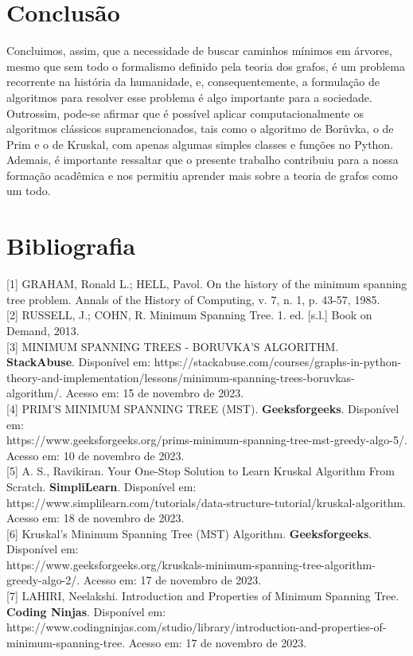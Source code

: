 \documentclass{article}
\begin{document}
\section{Conclusão}
Concluimos, assim, que a necessidade de buscar caminhos mínimos em árvores, mesmo que sem todo o formalismo definido pela teoria dos grafos, é um problema recorrente na história da humanidade, e, consequentemente, a formulação de algoritmos para resolver esse problema é algo importante para a sociedade. \\

Outrossim, pode-se afirmar que é possível aplicar computacionalmente os algoritmos clássicos supramencionados, tais como o algoritmo de Borůvka, o de Prim e o de Kruskal, com apenas algumas simples classes e funções no Python. \\

Ademais, é importante ressaltar que o presente trabalho contribuiu para a nossa formação acadêmica e nos permitiu aprender mais sobre a teoria de grafos como um todo.

\vspace{2cm}

\section{Bibliografia}
[1] GRAHAM, Ronald L.; HELL, Pavol. On the history of the minimum spanning tree problem. Annals of the History of Computing, v. 7, n. 1, p. 43-57, 1985. \\

[2] RUSSELL, J.; COHN, R. Minimum Spanning Tree. 1. ed. [s.l.] Book on Demand, 2013. \\

[3] MINIMUM SPANNING TREES - BORUVKA'S ALGORITHM. \textbf{StackAbuse}. Disponível em: https://stackabuse.com/courses/graphs-in-python-theory-and-implementation/lessons/minimum-spanning-trees-boruvkas-algorithm/. Acesso em: 15 de novembro de 2023. \\

[4] PRIM'S MINIMUM SPANNING TREE (MST). \textbf{Geeksforgeeks}. Disponível em: \\ https://www.geeksforgeeks.org/prims-minimum-spanning-tree-mst-greedy-algo-5/. Acesso em: 10 de novembro de 2023. \\

[5] A. S., Ravikiran. Your One-Stop Solution to Learn Kruskal Algorithm From Scratch. \textbf{SimpliLearn}. Disponível em: https://www.simplilearn.com/tutorials/data-structure-tutorial/kruskal-algorithm. Acesso em: 18 de novembro de 2023. \\

[6] Kruskal's Minimum Spanning Tree (MST) Algorithm. \textbf{Geeksforgeeks}. Disponível em: \\ https://www.geeksforgeeks.org/kruskals-minimum-spanning-tree-algorithm-greedy-algo-2/.
Acesso em: 17 de novembro de 2023. \\

[7] LAHIRI, Neelakshi. Introduction and Properties of Minimum Spanning Tree. \textbf{Coding Ninjas}. Disponível em: https://www.codingninjas.com/studio/library/introduction-and-properties-of-minimum-spanning-tree. Acesso em: 17 de novembro de 2023.
\end{document}
